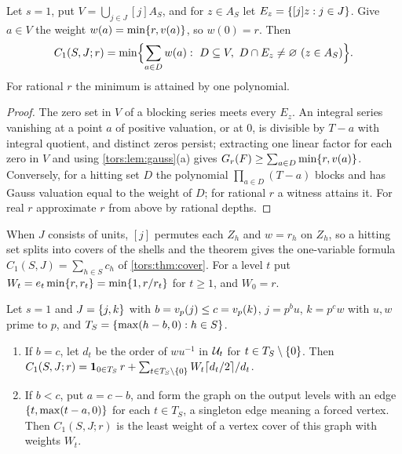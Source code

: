 \begin{theorem}\label{cost:thm:nonunitcover}
Let $s=1$, put $V=\bigcup_{j\in J}[j]A_S$, and for $z\in A_S$ let $E_z=\{[j]z:j\in J\}$.
Give $a\in V$ the weight $w(a)=\min\{r,v(a)\}$, so $w(0)=r$. Then
\[
 C_1(S,J;r)=\min\Bigl\{\sum_{a\in D}w(a):\ D\subseteq V,\ D\cap E_z\ne\varnothing
 \ (z\in A_S)\Bigr\}.
\]
For rational $r$ the minimum is attained by one polynomial.
\end{theorem}

\begin{proof}
The zero set in $V$ of a blocking series meets every $E_z$. An integral series vanishing at
a point $a$ of positive valuation, or at $0$, is divisible by $T-a$ with integral quotient,
and distinct zeros persist; extracting one linear factor for each zero in $V$ and using
\cref{tors:lem:gauss}(a) gives $G_r(F)\ge\sum_{a\in D}\min\{r,v(a)\}$. Conversely, for a
hitting set $D$ the polynomial $\prod_{a\in D}(T-a)$ blocks and has Gauss valuation equal
to the weight of $D$; for rational $r$ a witness attains it. For real $r$ approximate $r$
from above by rational depths.
\end{proof}

When $J$ consists of units, $[j]$ permutes each $Z_h$ and $w=r_h$ on $Z_h$, so a hitting set
splits into covers of the shells and the theorem gives the one-variable formula
$C_1(S,J)=\sum_{h\in S}c_h$ of \cref{tors:thm:cover}. For a level $t$ put
$W_t=e_t\min\{r,r_t\}=\min\{1,r/r_t\}$ for $t\ge1$, and $W_0=r$.

\begin{theorem}\label{cost:thm:pairpowers}
Let $s=1$ and $J=\{j,k\}$ with $b=v_p(j)\le c=v_p(k)$, $j=p^bu$, $k=p^cw$ with $u,w$
prime to $p$, and $T_S=\{\max(h-b,0):h\in S\}$.
\begin{enumerate}[label=\textup{(\alph*)}]
\item If $b=c$, let $d_t$ be the order of $wu^{-1}$ in $\mathcal{U}_t$ for $t\in T_S\setminus\{0\}$.
 Then $C_1(S,J;r)=\mathbf{1}_{0\in T_S}\,r+\sum_{t\in T_S\setminus\{0\}}W_t\lceil d_t/2\rceil/d_t$.
\item If $b<c$, put $a=c-b$, and form the graph on the output levels with an edge
 $\{t,\max(t-a,0)\}$ for each $t\in T_S$, a singleton edge meaning a forced vertex. Then
 $C_1(S,J;r)$ is the least weight of a vertex cover of this graph with weights $W_t$.
\end{enumerate}
\end{theorem}


